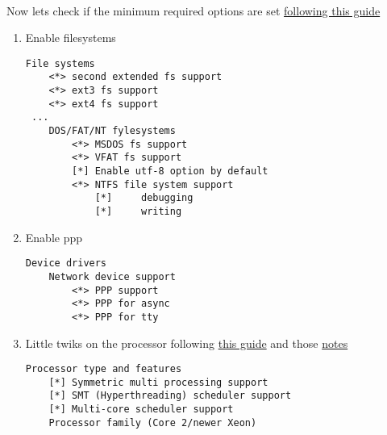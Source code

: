 \documentclass[10pt,a4paper]{article}
\begin{document}
                \newpage
                \paragraph{} Now lets check if the minimum required options are set \href{https://wiki.gentoo.org/wiki/Handbook:AMD64/Installation/Kernel#Activating_required_options}{following this guide}
                
                \begin{enumerate}
                    
                    \item Enable filesystems
                        \begin{lstlisting}[style=KernelConfig]
 File systems
    <*> second extended fs support
    <*> ext3 fs support
    <*> ext4 fs support
 ...
    DOS/FAT/NT fylesystems
        <*> MSDOS fs support
        <*> VFAT fs support
        [*] Enable utf-8 option by default
        <*> NTFS file system support
            [*] 	debugging
            [*]		writing
                        \end{lstlisting}
                        
                    \newpage
                    \item Enable ppp
                    
                        \begin{lstlisting}[style=KernelConfig]
 Device drivers
    Network device support
        <*> PPP support
        <*> PPP for async
        <*> PPP for tty
                         \end{lstlisting}
                         
                     
                     \newpage
                     \item Little twiks on the processor following \href{https://wiki.gentoo.org/wiki/Kernel/Gentoo_Kernel_Configuration_Guide#Multiprocessor.2C_Hyper-Threading_and_multi-core_systems}{this guide} and those \href{https://forums.gentoo.org/viewtopic-t-939150-start-0.html}{notes}
                     
                        \begin{lstlisting}[style=KernelConfig]
 Processor type and features
    [*] Symmetric multi processing support
    [*] SMT (Hyperthreading) scheduler support
    [*] Multi-core scheduler support
    Processor family (Core 2/newer Xeon)
                        \end{lstlisting}                  
                    

\end{enumerate}
\end{document}
